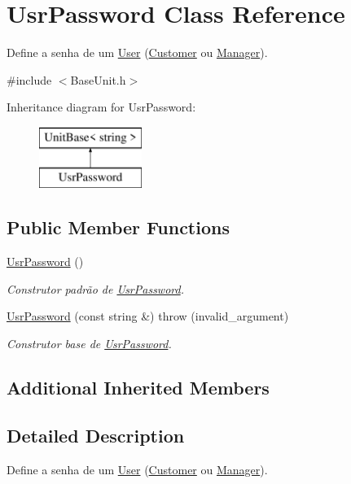 \hypertarget{classUsrPassword}{\section{Usr\-Password Class Reference}
\label{d9/d39/classUsrPassword}
}


Define a senha de um \hyperlink{classUser}{User} (\hyperlink{classCustomer}{Customer} ou \hyperlink{classManager}{Manager}).  




{\ttfamily \#include $<$Base\-Unit.\-h$>$}

Inheritance diagram for Usr\-Password\-:\begin{figure}[H]
\begin{center}
\leavevmode
\includegraphics[height=2.000000cm]{d9/d39/classUsrPassword}
\end{center}
\end{figure}
\subsection*{Public Member Functions}
\begin{DoxyCompactItemize}
\item 
\hyperlink{classUsrPassword_ab86dc59f9c9ba2325342c4dfc8f243d6}{Usr\-Password} ()
\begin{DoxyCompactList}\small\item\em Construtor padrão de \hyperlink{classUsrPassword}{Usr\-Password}. \end{DoxyCompactList}\item 
\hyperlink{classUsrPassword_ab99c93719778f9560712675b1febb3cb}{Usr\-Password} (const string \&)  throw (invalid\-\_\-argument)
\begin{DoxyCompactList}\small\item\em Construtor base de \hyperlink{classUsrPassword}{Usr\-Password}. \end{DoxyCompactList}\end{DoxyCompactItemize}
\subsection*{Additional Inherited Members}


\subsection{Detailed Description}
Define a senha de um \hyperlink{classUser}{User} (\hyperlink{classCustomer}{Customer} ou \hyperlink{classManager}{Manager}). 


